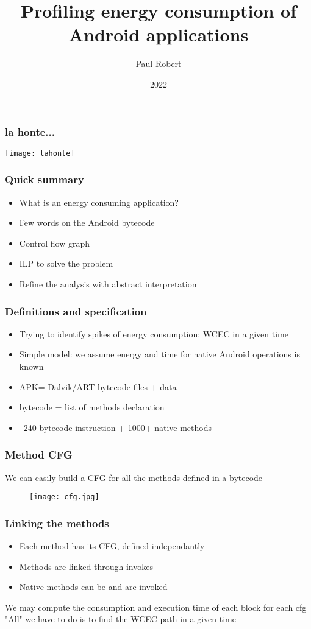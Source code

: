 \documentclass{beamer}
\title{Profiling energy consumption of Android applications}
\author{Paul Robert}
\date{2022}
\begin{document}
\frame{\titlepage}

\begin{frame}
    \frametitle{la honte...}
    \texttt{[image: lahonte]}
\end{frame}

\begin{frame}
    \frametitle{Quick summary}
    \begin{itemize}
        \pause
        \item What is an energy consuming application? \pause
        \item Few words on the Android bytecode \pause
        \item Control flow graph \pause
        \item ILP to solve the problem \pause
        \item Refine the analysis with abstract interpretation
    \end{itemize}
\end{frame}

\begin{frame}
    \frametitle{Definitions and specification}
    \begin{itemize}
        \pause
        \item Trying to identify spikes of energy consumption: WCEC in a given time \pause
        \item Simple model: we assume energy and time for native Android operations is known
        \item APK= Dalvik/ART bytecode files + data \pause 
        \item bytecode = list of methods declaration
        \item ~240 bytecode instruction + 1000+ native methods
    \end{itemize}
\end{frame}

\begin{frame}
    \frametitle{Method CFG}
    We can easily build a CFG for all the methods defined in a bytecode \pause 
    \begin{figure}[h]
        \texttt{[image: cfg.jpg]}
    \end{figure}
\end{frame}

\begin{frame}
    \frametitle{Linking the methods}
    \pause
    \begin{itemize}
        \item Each method has its CFG, defined independantly \pause 
        \item Methods are linked through invokes \pause
        \item Native methods can be and are invoked \pause
    \end{itemize}
    We may compute the consumption and execution time of each block for each cfg \\ \pause 
    "All" we have to do is to find the WCEC path in a given time 
\end{frame}
\end{document}

